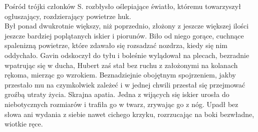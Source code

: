 \documentclass[../MAIN.tex]{subfiles}
\begin{document}
Pośród trójki członków S. rozbłysło oślepiające światło, któremu towarzyszył ogłuszający, rozdzierający powietrze huk.\\
Był ponad dwukrotnie większy, niż poprzednio, złożony z jeszcze większej ilości jeszcze bardziej poplątanych iskier i piorunów. Biło od niego gorące, cuchnące spalenizną powietrze, które zdawało się rozsadzać nozdrza, kiedy się nim oddychało. Gavin odskoczył do tyłu i boleśnie wylądował na plecach, bezradnie wpatrując się w ducha, Hubert zaś stał bez ruchu z założonymi na kolanach rękoma, mierząc go wzrokiem. Beznadziejnie obojętnym spojrzeniem, jakby przestało mu na czymkolwiek zależeć i w jednej chwili przestał się przejmować groźbą utraty życia. Skrajna apatia.
Jedna z wijących się iskier urosła do niebotycznych rozmiarów i trafiła go w twarz, zrywając go z nóg. Upadł bez słowa ani wydania z siebie nawet cichego krzyku, rozrzucając na boki bezwładne, wiotkie ręce.
\end{document}
